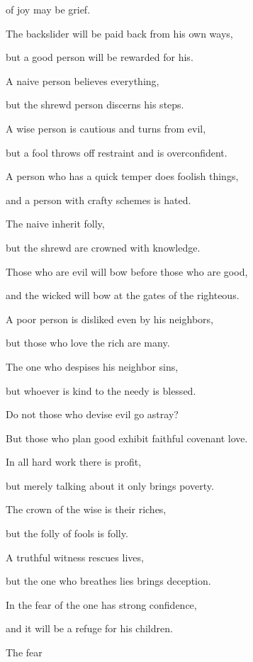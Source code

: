 {of joy
may be grief.
\par }{\Q {}The backslider
will be paid back from his own ways,
\par }{\Q but
a good
person
will be rewarded for his.
\par }{\Q {}A naive person
believes
everything,
\par }{\Q but the shrewd
person discerns
his steps.
\par }{\Q {}A wise
person is cautious
and turns
from evil,
\par }{\Q but a fool
throws off restraint
and is overconfident.
\par }{\Q {}A person who has a quick temper
does
foolish
things,
\par }{\Q and a person
with crafty schemes
is hated.
\par }{\Q {}The naive
inherit
folly,
\par }{\Q but the shrewd
are crowned
with knowledge.
\par }{\Q {}Those who are evil
will bow
before
those who are good,
\par }{\Q and the wicked
will bow at the gates
of the righteous.
\par }{\Q {}A poor
person is disliked
even
by his neighbors,
\par }{\Q but those who
love
the rich
are many.
\par }{\Q {}The one who despises
his neighbor
sins,
\par }{\Q but whoever is kind
to the needy
is blessed.
\par }{\Q {}Do not
those who devise
evil
go astray?
\par }{\Q But those who plan good
exhibit
faithful covenant love.
\par }{\Q {}In all
hard work
there is profit,
\par }{\Q but merely talking
about it
only
brings poverty.
\par }{\Q {}The crown
of the wise
is their riches,
\par }{\Q but the folly
of fools
is folly.
\par }{\Q {}A truthful
witness
rescues
lives,
\par }{\Q but the one who breathes
lies
brings deception.
\par }{\Q {}In the fear
of the
{}
one has strong
confidence,
\par }{\Q and it will be
a refuge
for his children.
\par }{\Q {}The fear
}
